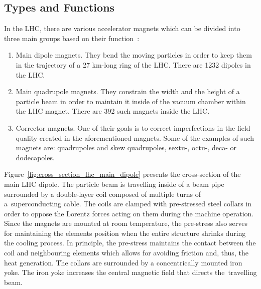 
\subsection{Types and Functions}

In the LHC, there are various accelerator magnets which can be divided into three main groups based on their function~\cite{cern_main_webpage}: 
\begin{enumerate}
    \item Main dipole magnets. They bend the moving particles in order to keep them in the trajectory of a 27 km-long ring of the LHC. There are 1232 dipoles in the LHC.
    \item Main quadrupole magnets. They constrain the width and the height of a particle beam in order to maintain it inside of the vacuum chamber within the LHC magnet. There are 392 such magnets inside the LHC.
    \item Corrector magnets. One of their goals is to correct imperfections in the field quality created in the aforementioned magnets. Some of the examples of such magnets are: quadrupoles and skew quadrupoles, sextu-, octu-, deca- or dodecapoles. 
\end{enumerate}

Figure~\ref{fig:cross_section_lhc_main_dipole} presents the cross-section of the main LHC dipole. The particle beam is travelling inside of a beam pipe surrounded by a double-layer coil composed of multiple turns of a~superconducting cable. The coils are clamped with pre-stressed steel collars in order to oppose the Lorentz forces acting on them during the machine operation. Since the magnets are mounted at room temperature, the pre-stress also serves for maintaining the elements position when the entire structure shrinks during the cooling process. In principle, the pre-stress maintains the contact between the coil and neighbouring elements which allows for avoiding friction and, thus, the heat generation. The collars are surrounded by a concentrically mounted iron yoke. The iron yoke increases the central magnetic field that directs the~travelling beam.

